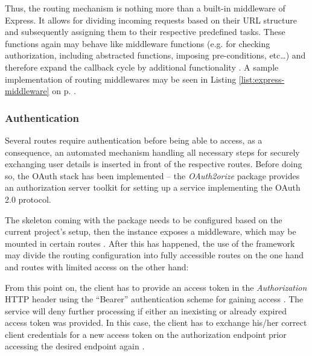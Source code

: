 Thus, the routing mechanism is nothing more than a built-in middleware of Express. It allows for dividing incoming requests based on their URL structure and subsequently assigning them to their respective predefined tasks. These functions again may behave like middleware functions (e.g. for checking authorization, including abstracted functions, imposing pre-conditions, etc\ldots) and therefore expand the callback cycle by additional functionality \cite{ExpressRouter}. A sample implementation of routing middlewares may be seen in Listing \ref{list:express-middleware} on p. \pageref{list:express-middleware}.

\subsubsection{Authentication}
Several routes require authentication before being able to access, as a consequence, an automated mechanism handling all necessary steps for securely exchanging user details is inserted in front of the respective routes. Before doing so, the OAuth stack has been implemented -- the \emph{OAuth2orize} package provides an authorization server toolkit for setting up a service implementing the OAuth 2.0 protocol.

The skeleton coming with the package needs to be configured based on the current project's setup, then the instance exposes a middleware, which may be mounted in certain routes \cite{OAuth2orizeGitHub}. After this has happened, the use of the framework may divide the routing configuration into fully accessible routes on the one hand and routes with limited access on the other hand:



From this point on, the client has to provide an access token in the \emph{Authorization} HTTP header using the ``Bearer'' authentication scheme for gaining access \cite[5]{RFC6750}. The service will deny further processing if either an inexisting or already expired access token was provided. In this case, the client has to exchange his/her correct client credentials for a new access token on the authorization endpoint prior accessing the desired endpoint again \cite[41]{hardt2012oauth}.


